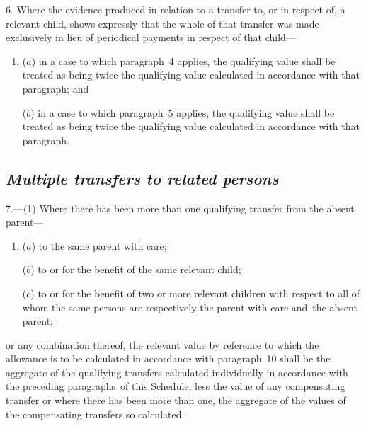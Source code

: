 \documentclass[12pt,a4paper]{article}
\begin{document}
6.  Where the evidence produced in relation to a transfer to, or in respect of, a relevant child, shows expressly that the whole of that transfer was made exclusively in lieu of periodical payments in respect of that child—
\begin{enumerate}\item[]
($a$) in a case to which paragraph~4 applies, 
the qualifying value shall be treated as being twice the qualifying value calculated in accordance with that paragraph;  %
and

($b$) in a case to which paragraph~5 applies, the qualifying value shall be 
treated as being twice the qualifying value calculated in accordance with that paragraph.  %
\end{enumerate}


\subsection*{\itshape Multiple transfers to related persons}

7.—(1) Where there has been more than one qualifying transfer from the absent parent—
\begin{enumerate}\item[]
($a$) to the same parent with care;

($b$) to or for the benefit of the same relevant child;

($c$) to or for the benefit of two or more relevant children with respect to all of whom the same persons are respectively the parent with care and~the absent parent;
\end{enumerate}
or any combination thereof, the relevant value by reference to which the allowance is to be calculated in accordance with paragraph~10 shall be the aggregate of the qualifying transfers calculated individually in accordance with the preceding paragraphs~of this Schedule, less the value of any compensating transfer or where there has been more than one, the aggregate of the values of the compensating transfers so calculated.
\end{document}
